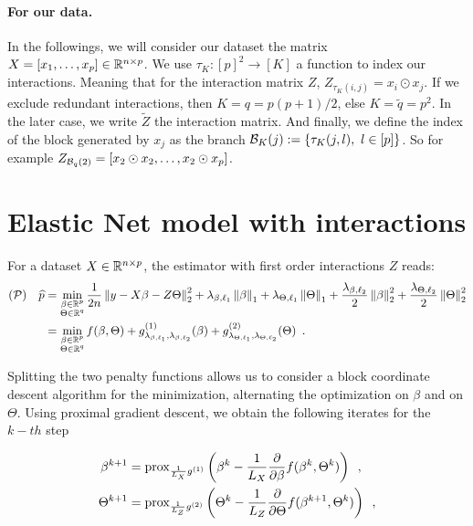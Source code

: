 \documentclass[a4]{article}
\begin{document}
\paragraph{For our data.}
In the followings, we will consider our dataset the matrix $X=[x_1,\dots, x_p]\in\mathbb{R}^{n\times p}$.
We use $\tau_K : [p]^2 \longrightarrow [K]$ a function to index our interactions. Meaning that for the interaction matrix $Z$, $Z_{\tau_K(i,j)} = x_i\odot x_j$.
If we exclude redundant interactions, then $K=q=p(p+1)/2$, else $K=\widetilde q=p^2$. In the later case, we write $\widetilde Z$ the interaction matrix.
And finally, we define the index of the block generated by $x_j$ as the branch $\branch{K}{j}:=\{\tau_K(j,l),\ l\in [p]\}$.
So for example $Z_{\mathcal{B}_{q}(2)}=[x_2\odot x_2, \dots, x_2\odot x_p]$.



\section*{Elastic Net model with interactions}

For a dataset $X\in\mathbb{R}^{n\times p}$, the estimator with first order interactions $Z$ reads:
\begin{align} \label{pb:init}
	(\mathcal{P}) \quad \widehat{p}
	 & = \min_{\substack{\beta \in \mathbb{R}^p \\ \Theta \in \mathbb{R}^q}}
	\frac{1}{2 n} \left \lVert y - X\beta - Z\Theta \right \rVert^2_2 +
	\lambda_{\beta, \ell_1} \left \lVert \beta \right \rVert_1 + \lambda_{\Theta, \ell_1} \left \lVert \Theta \right \rVert_1 +
	\frac{\lambda_{\beta, \ell_2}}{2} \left \lVert \beta \right \rVert_2^2 + \frac{\lambda_{\Theta, \ell_2}}{2} \left \lVert \Theta \right \rVert_2^2 \\
	 & = \min_{\substack{\beta \in \mathbb{R}^p \\ \Theta \in \mathbb{R}^q}}
	f(\beta, \Theta) + g^{(1)}_{\lambda_{\beta, \ell_1}, \lambda_{\beta, \ell_2}}(\beta) + g^{(2)}_{\lambda_{\Theta, \ell_1}, \lambda_{\Theta, \ell_2}}(\Theta)\enspace .
\end{align}

Splitting the two penalty functions allows us to consider a block coordinate descent algorithm for the minimization, alternating the optimization on $\beta$ and on $\Theta$.
Using proximal gradient descent, we obtain the following iterates for the $k-{th}$ step

\begin{align}
	\beta^{k+1}  & =
	\operatorname{prox}_{\frac{1}{L_X}g^{(1)}}
	\left(\beta^k - \frac{1}{L_X}\frac{\partial}{\partial \beta}f(\beta^k, \Theta^k)\right)\enspace, \\
	\Theta^{k+1} & =
	\operatorname{prox}_{\frac{1}{L_Z}g^{(2)}}
	\left(\Theta^k - \frac{1}{L_Z}\frac{\partial}{\partial \Theta}f(\beta^{k+1}, \Theta^k)\right)\enspace,
\end{align}
\end{document}
